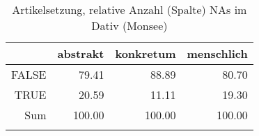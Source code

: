 \begin{table}[ht]
\centering
\begin{tabular}{rrrr}
  \lsptoprule
 & abstrakt & konkretum & menschlich \\ 
  \midrule
FALSE & 79.41 & 88.89 & 80.70 \\ 
  TRUE & 20.59 & 11.11 & 19.30 \\ 
  Sum & 100.00 & 100.00 & 100.00 \\ 
   \lspbottomrule
\end{tabular}
\caption{Artikelsetzung, relative Anzahl (Spalte) NAs im Dativ (Monsee)} 
\end{table}
